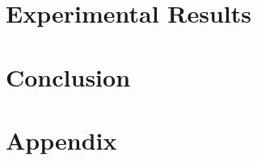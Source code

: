 \documentclass[oneside]{ecsthesis}       %
\begin{document}

\chapter{Experimental Results}\label{experimental-results}



\chapter{Conclusion}\label{conclusion}


\chapter{Appendix} \label{Chapter:Appendix}


\backmatter



\end{document}
